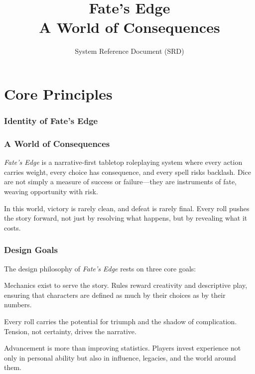 \documentclass[12pt]{book}
\title{\Huge Fate's Edge \\[6pt] \Large A World of Consequences}
\author{System Reference Document (SRD)}
\date{}
\begin{document}
\maketitle
\tableofcontents
\newpage

\part{Core Principles}

\section{Identity of Fate's Edge}

\section{A World of Consequences}
\textit{Fate’s Edge} is a narrative-first tabletop roleplaying system where every action carries weight, every choice has consequence, and every spell risks backlash. Dice are not simply a measure of success or failure—they are instruments of fate, weaving opportunity with risk.  

In this world, victory is rarely clean, and defeat is rarely final. Every roll pushes the story forward, not just by resolving what happens, but by revealing what it costs.  

\section{Design Goals}
The design philosophy of \textit{Fate’s Edge} rests on three core goals:  

\begin{description}[leftmargin=2cm, style=nextline]
  \item[Narrative Primacy] Mechanics exist to serve the story. Rules reward creativity and descriptive play, ensuring that characters are defined as much by their choices as by their numbers.  
  \item[Risk as Drama] Every roll carries the potential for triumph and the shadow of complication. Tension, not certainty, drives the narrative.  
  \item[Meaningful Growth] Advancement is more than improving statistics. Players invest experience not only in personal ability but also in influence, legacies, and the world around them.  
\end{description}
\end{document}
